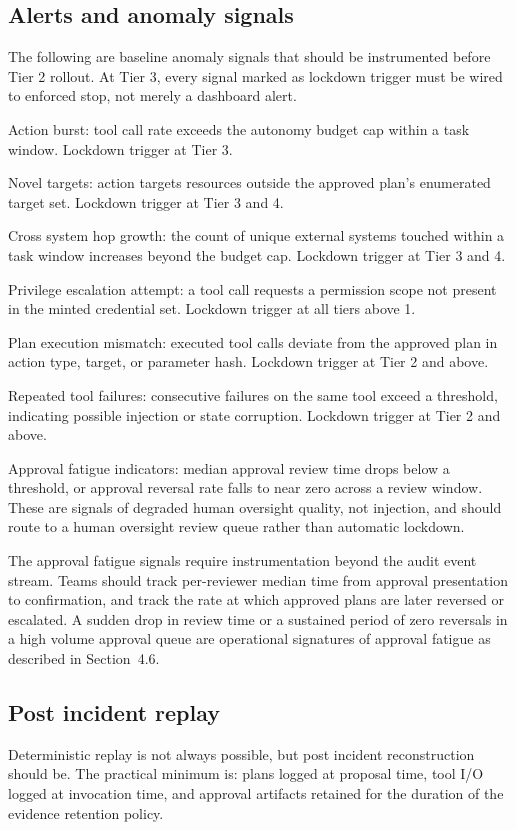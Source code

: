 \documentclass[11pt]{article}
\begin{document}
\subsection{Alerts and anomaly signals}
The following are baseline anomaly signals that should be instrumented before Tier 2 rollout. At Tier 3, every signal marked as lockdown trigger must be wired to enforced stop, not merely a dashboard alert.

Action burst: tool call rate exceeds the autonomy budget cap within a task window. Lockdown trigger at Tier 3.

Novel targets: action targets resources outside the approved plan's enumerated target set. Lockdown trigger at Tier 3 and 4.

Cross system hop growth: the count of unique external systems touched within a task window increases beyond the budget cap. Lockdown trigger at Tier 3 and 4.

Privilege escalation attempt: a tool call requests a permission scope not present in the minted credential set. Lockdown trigger at all tiers above 1.

Plan execution mismatch: executed tool calls deviate from the approved plan in action type, target, or parameter hash. Lockdown trigger at Tier 2 and above.

Repeated tool failures: consecutive failures on the same tool exceed a threshold, indicating possible injection or state corruption. Lockdown trigger at Tier 2 and above.

Approval fatigue indicators: median approval review time drops below a threshold, or approval reversal rate falls to near zero across a review window. These are signals of degraded human oversight quality, not injection, and should route to a human oversight review queue rather than automatic lockdown.

The approval fatigue signals require instrumentation beyond the audit event stream. Teams should track per-reviewer median time from approval presentation to confirmation, and track the rate at which approved plans are later reversed or escalated. A sudden drop in review time or a sustained period of zero reversals in a high volume approval queue are operational signatures of approval fatigue as described in Section~4.6.

\subsection{Post incident replay}
Deterministic replay is not always possible, but post incident reconstruction should be. The practical minimum is: plans logged at proposal time, tool I/O logged at invocation time, and approval artifacts retained for the duration of the evidence retention policy.
\end{document}
